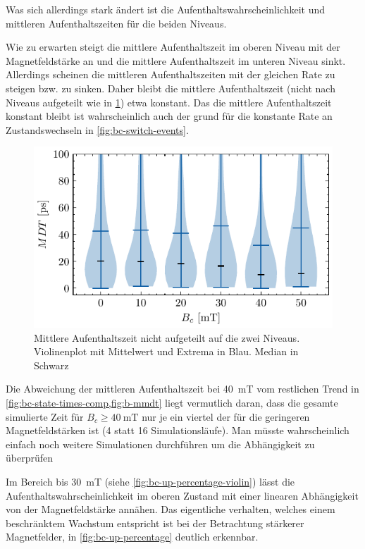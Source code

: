 \documentclass[main.tex]{subfiles}
\begin{document}
Was sich allerdings stark ändert ist die Aufenthaltswahrscheinlichkeit und mittleren Aufenthaltszeiten für die beiden Niveaus.

Wie zu erwarten steigt die mittlere Aufenthaltszeit im oberen Niveau mit der Magnetfeldstärke an und die mittlere Aufenthaltszeit im unteren Niveau sinkt. 
Allerdings scheinen die mittleren Aufenthaltszeiten mit der gleichen Rate zu steigen bzw. zu sinken. Daher bleibt die mittlere Aufenthaltszeit (nicht nach Niveaus aufgeteilt wie in \cref{fig:b-mmdt}) etwa konstant. 
Das die mittlere Aufenthaltszeit konstant bleibt ist wahrscheinlich auch der grund für die konstante Rate an Zustandswechseln in \cref{fig:bc-switch-events}. 

\begin{figure}[H]
    \centering
    \includegraphics{bilder/plots/max_Bz/mean_dwell_time.pdf}
    \caption[Mittlere Aufenthaltszeit nicht aufgeteilt auf die zwei Niveaus.]{Mittlere Aufenthaltszeit nicht aufgeteilt auf die zwei Niveaus. Violinenplot mit Mittelwert und Extrema in Blau. Median in Schwarz}
    \label{fig:b-mmdt}
\end{figure}

Die Abweichung der mittleren Aufenthaltszeit bei \SI{40}{\milli\tesla} vom restlichen Trend in \cref{fig:bc-state-times-comp,fig:b-mmdt} liegt vermutlich daran, dass die gesamte simulierte Zeit für \(B_c \geq \SI{40}{\milli\tesla}\) nur je ein viertel der für die geringeren Magnetfeldstärken ist (4 statt 16 Simulationsläufe). Man müsste wahrscheinlich einfach noch weitere Simulationen durchführen um die Abhängigkeit zu überprüfen

Im Bereich bis \SI{30}{\milli\tesla} (siehe \cref{fig:bc-up-percentage-violin}) lässt die Aufenthaltswahrscheinlichkeit im oberen Zustand mit einer linearen Abhängigkeit von der Magnetfeldstärke annähen. Das eigentliche verhalten, welches einem beschränktem Wachstum entspricht ist bei der Betrachtung stärkerer Magnetfelder, in \cref{fig:bc-up-percentage} deutlich erkennbar. 
\end{document}
